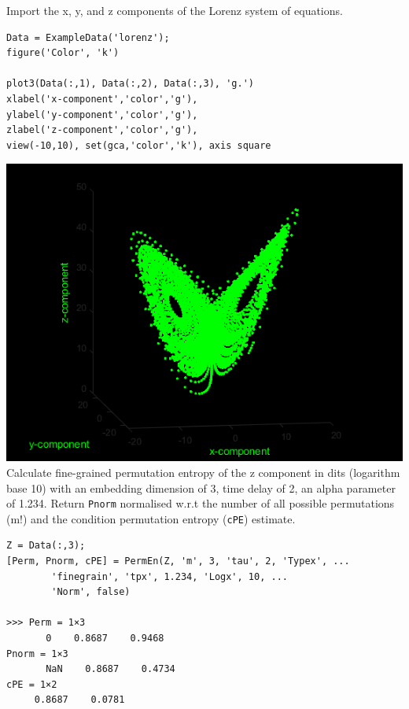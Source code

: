 \documentclass[12pt, a4paper, titlepage, openany]{book}
\begin{document}
\noindent Import the x, y, and z components of the Lorenz system of equations.
\begin{verbatim}
Data = ExampleData('lorenz');
figure('Color', 'k')

plot3(Data(:,1), Data(:,2), Data(:,3), 'g.')
xlabel('x-component','color','g'), 
ylabel('y-component','color','g'), 
zlabel('z-component','color','g'), 
view(-10,10), set(gca,'color','k'), axis square
\end{verbatim}
\includegraphics[scale=.4]{lorenz.png}\newline \newline
\noindent Calculate fine-grained permutation entropy of the z component in dits (logarithm base 10) with an embedding dimension of 3, time delay of 2, an alpha parameter of 1.234. Return \texttt{Pnorm} normalised w.r.t the number of all possible permutations (m!) and the condition permutation entropy (\texttt{cPE}) estimate.
\begin{verbatim}
Z = Data(:,3);
[Perm, Pnorm, cPE] = PermEn(Z, 'm', 3, 'tau', 2, 'Typex', ...
		'finegrain', 'tpx', 1.234, 'Logx', 10, ...
		'Norm', false)

>>> Perm = 1×3
       0    0.8687    0.9468
Pnorm = 1×3
       NaN    0.8687    0.4734
cPE = 1×2
   	 0.8687    0.0781
\end{verbatim}

\newpage
\end{document}
